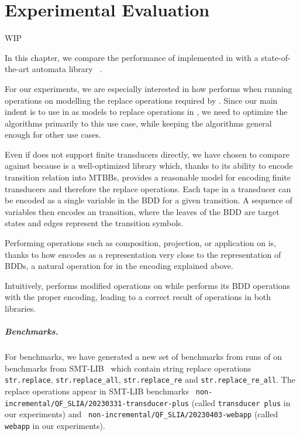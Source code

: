 \chapter{Experimental Evaluation}

WIP

In this chapter, we compare the performance of \nfts implemented in \mata with a state-of-the-art automata library \mona~\cite{mona}.

For our experiments, we are especially interested in how \mata performs when running operations on \nfts modelling the replace operations required by \noodler.
Since our main indent is to use \nfts in \mata as models to replace operations in \noodler, we need to optimize the \nft algorithms primarily to this use case, while keeping the \nft algorithms general enough for other use cases.

Even if \mona does not support finite transducers directly, we have chosen \mona to compare \mata against because \mona is a well-optimized library which, thanks to its ability to encode transition relation into MTBBs, provides a reasonable model for encoding finite transducers and therefore the replace operations.
Each tape in a transducer can be encoded as a single variable in the BDD for a given transition.
A sequence of variables then encodes an \nft transition, where the leaves of the BDD are target states and edges represent the transition symbols.

Performing operations such as composition, projection, or application on \nfts is, thanks to how \mata encodes \nfts as a representation very close to the representation of BDDs, a natural operation for \mona in the encoding explained above.

Intuitively, \mata performs modified \nfa operations on \nfts while \mona performs its BDD operations with the proper encoding, leading to a correct result of \nft operations in both libraries.

\paragraph{Benchmarks.}

For benchmarks, we have generated a new set of benchmarks from runs of \noodler on benchmarks from SMT-LIB~\cite{SMTLIB} which contain string replace operations \texttt{str.replace}, \texttt{str.replace\_all}, \texttt{str.replace\_re} and \texttt{str.replace\_re\_all}.
The replace operations appear in SMT-LIB benchmarks \texttt{
non-incremental/QF\_SLIA/20230331-transducer-plus} (called \texttt{transducer plus} in our experiments) and \texttt{
non-incremental/QF\_SLIA/20230403-webapp} (called \texttt{webapp} in our experiments).

